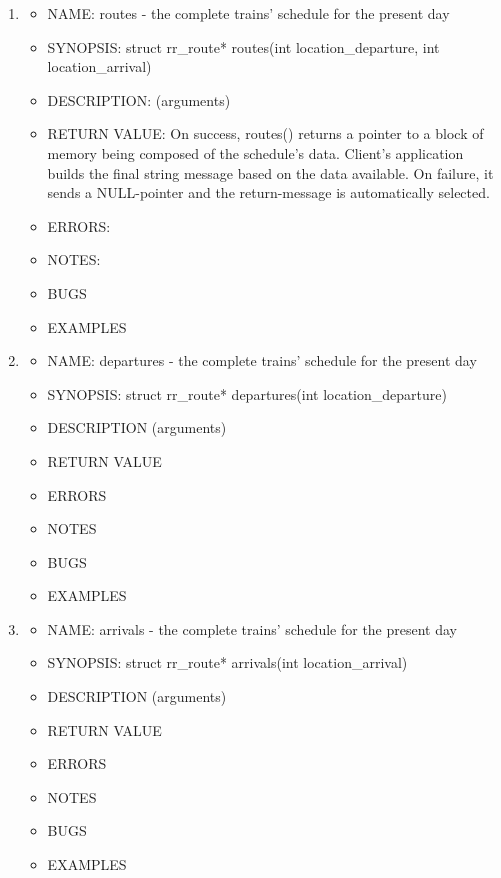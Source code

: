 \documentclass[runningheads]{llncs}
\begin{document}
\begin{enumerate}
   \item \begin{itemize} \item NAME: routes - the complete trains' schedule for the present day
            \item SYNOPSIS: struct rr\_route* routes(int location\_departure, int location\_arrival)  
            \item DESCRIPTION: (arguments)
            \item RETURN VALUE: On success, routes() returns a pointer to a block of memory being composed of the schedule's data. Client's application builds the final string message based on the data available. On failure, it sends a NULL-pointer and the return-message is automatically selected. 
            \item ERRORS:
            \item NOTES:
            
            \item BUGS
            \item EXAMPLES  
            \vspace{0.3cm}
   \end{itemize}
   
   \item \begin{itemize} \item NAME: departures - the complete trains' schedule for the present day
            \item SYNOPSIS: struct rr\_route* departures(int location\_departure)  
            \item DESCRIPTION (arguments)
            \item RETURN VALUE
            \item ERRORS
            \item NOTES
            \item BUGS
            \item EXAMPLES  
            \vspace{0.3cm}
   \end{itemize}
   
   \item \begin{itemize} \item NAME: arrivals - the complete trains' schedule for the present day
            \item SYNOPSIS: struct rr\_route* arrivals(int location\_arrival)  
            \item DESCRIPTION (arguments)
            \item RETURN VALUE
            \item ERRORS
            \item NOTES
            \item BUGS
            \item EXAMPLES  
            \vspace{0.3cm}
   \end{itemize}
   

\end{enumerate}
\end{document}
